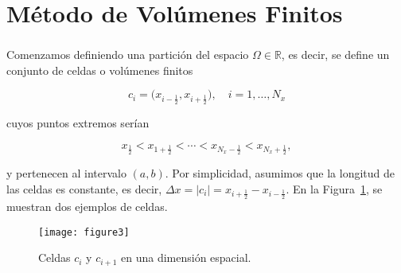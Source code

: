 \section{Método de Volúmenes Finitos}

\begin{frame}
    \frametitle{\secname}

    Comenzamos definiendo una partición del espacio
    $\Omega\in\mathbb{R}$, es decir, se define un conjunto de celdas o
    volúmenes finitos

    \begin{equation*}
        c_{i}=
        \big(
        x_{i-\frac{1}{2}},
        x_{i+\frac{1}{2}}
        \big),\quad
        i=1,\dotsc,N_{x}
    \end{equation*}

    cuyos puntos extremos serían

    \begin{equation*}
        x_{\frac{1}{2}}<
        x_{1+\frac{1}{2}}<
        \cdots<
        x_{N_{x}-\frac{1}{2}}<
        x_{N_{x}+\frac{1}{2}},
    \end{equation*}

    y pertenecen al intervalo $\left(a,b\right)$.
    Por simplicidad, asumimos que la longitud de las celdas es constante,
    es decir,
    \begin{math}
        \Delta x=
        \left|c_{i}\right|=
        x_{i+\frac{1}{2}}-
        x_{i-\frac{1}{2}}
    \end{math}.
    En la Figura~\ref{fig:cellsunidimensional}, se muestran dos ejemplos
    de celdas.

    \begin{figure}[ht!]
        \centering
        \texttt{[image: figure3]}
        \caption{Celdas $c_{i}$ y $c_{i+1}$ en una dimensión espacial.}
        \label{fig:cellsunidimensional}
    \end{figure}
\end{frame}

